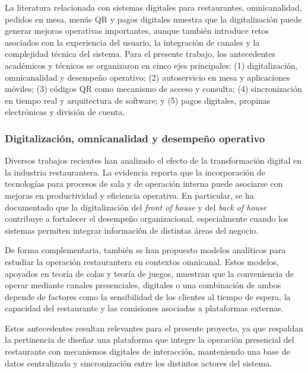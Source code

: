 \documentclass[12pt]{report}
\begin{document}
La literatura relacionada con sistemas digitales para restaurantes, omnicanalidad, pedidos en mesa, menús QR y pagos digitales muestra que la digitalización puede generar mejoras operativas importantes, aunque también introduce retos asociados con la experiencia del usuario, la integración de canales y la complejidad técnica del sistema. Para el presente trabajo, los antecedentes académicos y técnicos se organizaron en cinco ejes principales: (1) digitalización, omnicanalidad y desempeño operativo; (2) autoservicio en mesa y aplicaciones móviles; (3) códigos QR como mecanismo de acceso y consulta; (4) sincronización en tiempo real y arquitectura de software; y (5) pagos digitales, propinas electrónicas y división de cuenta.

\subsubsection{Digitalización, omnicanalidad y desempeño operativo}

Diversos trabajos recientes han analizado el efecto de la transformación digital en la industria restaurantera. La evidencia reporta que la incorporación de tecnologías para procesos de sala y de operación interna puede asociarse con mejoras en productividad y eficiencia operativa. En particular, se ha documentado que la digitalización del \textit{front of house} y del \textit{back of house} contribuye a fortalecer el desempeño organizacional, especialmente cuando los sistemas permiten integrar información de distintas áreas del negocio. \cite{lee2024digital}

De forma complementaria, también se han propuesto modelos analíticos para estudiar la operación restaurantera en contextos omnicanal. Estos modelos, apoyados en teoría de colas y teoría de juegos, muestran que la conveniencia de operar mediante canales presenciales, digitales o una combinación de ambos depende de factores como la sensibilidad de los clientes al tiempo de espera, la capacidad del restaurante y las comisiones asociadas a plataformas externas. \cite{wang2024omnichannel}

Estos antecedentes resultan relevantes para el presente proyecto, ya que respaldan la pertinencia de diseñar una plataforma que integre la operación presencial del restaurante con mecanismos digitales de interacción, manteniendo una base de datos centralizada y sincronización entre los distintos actores del sistema.
\end{document}
